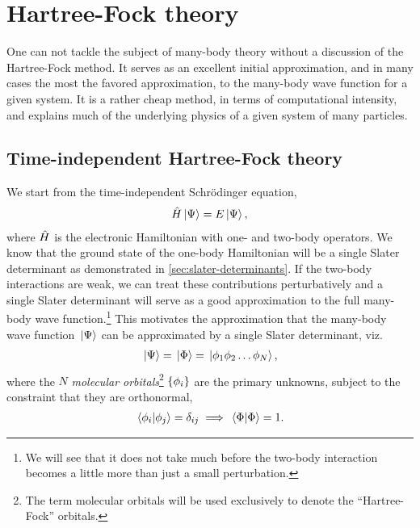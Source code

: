 \chapter{Hartree-Fock theory}
    \label{chap:hf}
    One can not tackle the subject of many-body theory without a discussion of
    the Hartree-Fock method.
    It serves as an excellent initial approximation, and in many cases the most
    the favored approximation, to the many-body wave function for a given system.
    It is a rather cheap method, in terms of computational intensity, and
    explains much of the underlying physics of a given system of many particles.

    \section{Time-independent Hartree-Fock theory}
        \label{sec:hf}
        We start from the time-independent Schrödinger equation,
        \begin{align}
            \hat{H}\ket*{\Psi} = E\ket*{\Psi},
        \end{align}
        where $\hat{H}$ is the electronic Hamiltonian with one- and two-body
        operators.
        We know that the ground state of the one-body Hamiltonian will be a
        single Slater determinant as demonstrated in
        \autoref{sec:slater-determinants}.
        If the two-body interactions are weak, we can treat these contributions
        perturbatively and a single Slater determinant will serve as a good
        approximation to the full many-body wave function.\footnote{%
            We will see that it does not take much before the two-body
            interaction becomes a little more than just a small perturbation.
        }
        This motivates the approximation that the many-body wave function
        $\ket*{\Psi}$ can be approximated by a single Slater determinant, viz.
        \begin{align}
            \ket*{\Psi} = \ket*{\Phi} = \ket*{\phi_1 \phi_2 \dots \phi_N},
        \end{align}
        where the $N$ \emph{molecular orbitals}\footnote{%
            The term molecular orbitals will be used exclusively to denote the
            ``Hartree-Fock'' orbitals.
        } $\left\{ \phi_i \right\}$ are the primary unknowns, subject to the constraint
        that they are orthonormal,
        \begin{align}
            \braket*{\phi_i}{\phi_j} = \delta_{ij}
            \implies
            \braket*{\Phi} = 1.
        \end{align}

